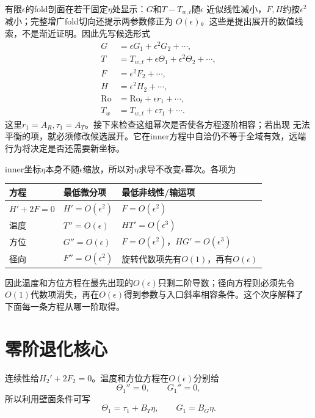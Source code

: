 \documentclass[UTF8,zihao=-4,openany]{ctexbook}
\newcommand{\eps}{\epsilon}
\newcommand{\Ro}{\mathrm{Ro}}
\begin{document}
有限$\eps$的fold剖面在若干固定$\eta$处显示：$G$和$T-T_{w,t}$随$\eps$
近似线性减小，$F,H$约按$\eps^2$减小；完整增广fold切向还提示两参数修正为
$O(\eps)$。这些是提出展开的数值线索，不是渐近证明。因此先写候选形式
\begin{subequations}\label{eq:innerexp}
\begin{align}
 G&=\eps G_1+\eps^2G_2+\cdots,\\
 T&=T_{w,t}+\eps\Theta_1+\eps^2\Theta_2+\cdots,\\
 F&=\eps^2F_2+\cdots,\\
 H&=\eps^2H_2+\cdots,\\
 \Ro&=\Ro_t+\eps r_1+\cdots,\\
 T_w&=T_{w,t}+\eps\tau_1+\cdots.
\end{align}
\end{subequations}
这里$r_1=A_R,\tau_1=A_T$。接下来检查这组幂次是否使各方程逐阶相容；若出现
无法平衡的项，就必须修改候选展开。它在inner方程中自洽仍不等于全域有效，远端
行为将决定是否还需要新坐标。

\begin{derivationbox}[：代入inner方程前的逐项阶数表]
inner坐标$\eta$本身不随$\eps$缩放，所以对$\eta$求导不改变$\eps$幂次。各项为
\begin{center}
\begin{tabular}{p{}p{}p{}}
\toprule
方程 & 最低微分项 & 最低非线性/输运项\\
\midrule
$H'+2F=0$ & $H'=O(\eps^2)$ & $F=O(\eps^2)$\\
温度 & $T''=O(\eps)$ & $HT'=O(\eps^3)$\\
方位 & $G''=O(\eps)$ & $F=O(\eps^2)$，$HG'=O(\eps^3)$\\
径向 & $F''=O(\eps^2)$ & 旋转代数项先有$O(1)$，再有$O(\eps)$\\
\bottomrule
\end{tabular}
\end{center}
因此温度和方位方程在最先出现的$O(\eps)$只剩二阶导数；径向方程则必须先令
$O(1)$代数项消失，再在$O(\eps)$得到参数与入口斜率相容条件。这个次序解释了
下面每一条方程从哪一阶取得。
\end{derivationbox}

\section{零阶退化核心}

连续性给$H_2'+2F_2=0$。温度和方位方程在$O(\eps)$分别给
\begin{equation}
 \Theta_1''=0,\qquad G_1''=0,
\end{equation}
所以利用壁面条件可写
\begin{equation}\label{eq:innerlinear}
 \Theta_1=\tau_1+B_T\eta,\qquad G_1=B_G\eta.
\end{equation}
\end{document}
